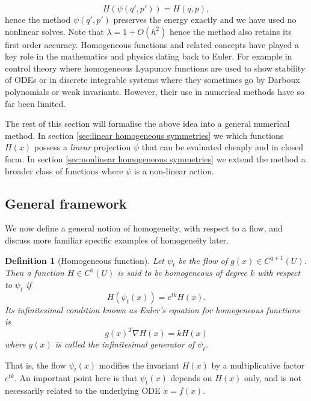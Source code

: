 \documentclass[final,3p,times]{elsarticle}
\newtheorem{definition}[theorem]{Definition}
\begin{document}
\begin{equation}
    H(\psi(q',p')) = H(q,p),
\end{equation}
hence the method $\psi(q',p')$ preserves the energy exactly and we have used no nonlinear solves. Note that $ \lambda = 1 + O(h^2)$ hence the method also retains its first order accuracy. Homogeneous functions and related concepts have played a key role in the mathematics and physics dating back to Euler. For example in control theory \cite{polyakov2020generalized,rosier1992homogeneous} where homogeneous Lyapunov functions are used to show stability of ODEs or in discrete integrable systems \cite{celledoni2019using, celledoni2019detecting} where they sometimes go by Darboux polynomials or weak invariants. However, their use in numerical methods have so far been limited. 

The rest of this section will formalise the above idea into a general numerical method. In section \ref{sec:linear homogeneous symmetries} we which functions $H(x)$ possess a \textit{linear} projection $\psi$ that can be evaluated cheaply and in closed form. In section \ref{sec:nonlinear homogeneous symmetries} we extend the method a broader class of functions where $\psi$ is a non-linear action. 
\subsection{General framework}
We now define a general notion of homogeneity, with respect to a flow, and discuss more familiar specific examples of homogeneity later.
\begin{definition}[Homogeneous function]
  Let $\psi_t$ be the flow of $g(x)\in C^{q+1}(U)$. Then a function $H \in C^1(U)$ is said to be homogeneous of degree $k$ with respect to $\psi_t$ if
\begin{equation}\label{hom cond}
    H(\psi_t(x))=e^{tk}H(x).
\end{equation}
Its infinitesimal condition known as Euler's equation for homogeneous functions is
\begin{equation}\label{euler eq}
    g(x)^T\nabla H(x)=k H(x)
\end{equation}
where $g(x)$ is called the infinitesimal generator of $\psi_t$.
\end{definition}
That is, the flow $\psi_t(x)$ modifies the invariant $H(x)$ by a multiplicative factor $e^{tk}$. An important point here is that $\psi_t(x)$ depends on $H(x)$ only, and is not necessarily related to the underlying ODE $\dot{x}=f(x)$.
\end{document}
